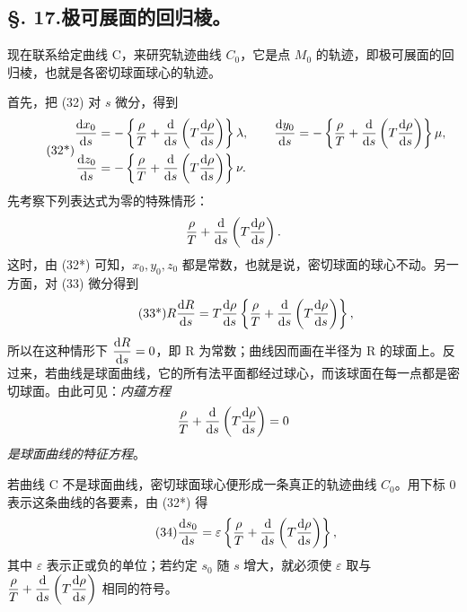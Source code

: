 \subsection*{\S. 17.\quad 极可展面的回归棱。}
现在联系给定曲线 C，来研究轨迹曲线 \(C_0\)，它是点 \(M_0\) 的轨迹，即极可展面的回归棱，也就是各密切球面球心的轨迹。

首先，把 (32) 对 \(s\) 微分，得到
\begin{equation}\tag{32*}
\begin{aligned}
\frac{\mathrm{d} x_0}{\mathrm{d} s}&=-\left\{\frac{\rho}{T}+\frac{\mathrm{d}}{\mathrm{d} s}\left(T\frac{\mathrm{d}\rho}{\mathrm{d} s}\right)\right\}\lambda,\qquad
\frac{\mathrm{d} y_0}{\mathrm{d} s}=-\left\{\frac{\rho}{T}+\frac{\mathrm{d}}{\mathrm{d} s}\left(T\frac{\mathrm{d}\rho}{\mathrm{d} s}\right)\right\}\mu,\\
\frac{\mathrm{d} z_0}{\mathrm{d} s}&=-\left\{\frac{\rho}{T}+\frac{\mathrm{d}}{\mathrm{d} s}\left(T\frac{\mathrm{d}\rho}{\mathrm{d} s}\right)\right\}\nu.
\end{aligned}
\end{equation}
先考察下列表达式为零的特殊情形：
\[
\frac{\rho}{T}+\frac{\mathrm{d}}{\mathrm{d} s}\left(T\frac{\mathrm{d}\rho}{\mathrm{d} s}\right).
\]
这时，由 (32*) 可知，\(x_0,y_0,z_0\) 都是常数，也就是说，密切球面的球心不动。另一方面，对 (33) 微分得到
\begin{equation}\tag{33*}
R\frac{\mathrm{d} R}{\mathrm{d} s}=T\frac{\mathrm{d}\rho}{\mathrm{d} s}\left\{\frac{\rho}{T}+\frac{\mathrm{d}}{\mathrm{d} s}\left(T\frac{\mathrm{d}\rho}{\mathrm{d} s}\right)\right\},
\end{equation}
所以在这种情形下 \(\dfrac{\mathrm{d} R}{\mathrm{d} s}=0\)，即 R 为常数；曲线因而画在半径为 R 的球面上。反过来，若曲线是球面曲线，它的所有法平面都经过球心，而该球面在每一点都是密切球面。由此可见：\emph{内蕴方程}
\[
\frac{\rho}{T}+\frac{\mathrm{d}}{\mathrm{d} s}\left(T\frac{\mathrm{d}\rho}{\mathrm{d} s}\right)=0
\]
\emph{是球面曲线的特征方程}。

若曲线 C 不是球面曲线，密切球面球心便形成一条真正的轨迹曲线 \(C_0\)。用下标 0 表示这条曲线的各要素，由 (32*) 得
\begin{equation}\tag{34}
\frac{\mathrm{d} s_0}{\mathrm{d} s}=\varepsilon\left\{\frac{\rho}{T}+\frac{\mathrm{d}}{\mathrm{d} s}\left(T\frac{\mathrm{d}\rho}{\mathrm{d} s}\right)\right\},
\end{equation}
其中 \(\varepsilon\) 表示正或负的单位；若约定 \(s_0\) 随 \(s\) 增大，就必须使 \(\varepsilon\) 取与 \(\dfrac{\rho}{T}+\dfrac{\mathrm{d}}{\mathrm{d} s}\left(T\dfrac{\mathrm{d}\rho}{\mathrm{d} s}\right)\) 相同的符号。

